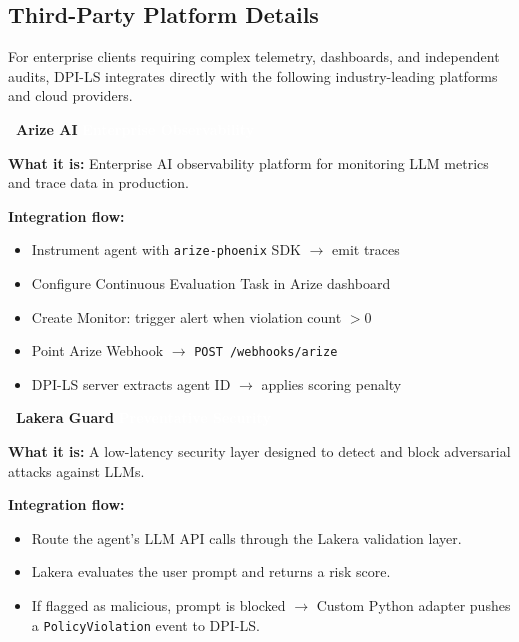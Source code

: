 \documentclass[11pt,a4paper]{article}
\begin{document}
\vspace{0.5cm}
\subsection{Third-Party Platform Details}

For enterprise clients requiring complex telemetry, dashboards, and independent audits, DPI-LS integrates directly with the following industry-leading platforms and cloud providers.

\vspace{0.5cm}
\noindent\textbf{\large \faEye\ Arize AI} \quad \colorbox{dpiteal}{\textcolor{white}{\small \textbf{Enterprise Observability}}}\\[0.2cm]
\begin{tcolorbox}[enhanced, colback=white, colframe=dpiteal, boxrule=0pt, leftrule=3pt, sharp corners, top=2mm, bottom=2mm]
\textbf{What it is:} Enterprise AI observability platform for monitoring LLM metrics and trace data in production.

\textbf{Integration flow:}
\begin{itemize}
    \item[\textcolor{dpiteal}{\textbf{1.}}] Instrument agent with \texttt{arize-phoenix} SDK $\rightarrow$ emit traces
    \item[\textcolor{dpiteal}{\textbf{2.}}] Configure Continuous Evaluation Task in Arize dashboard
    \item[\textcolor{dpiteal}{\textbf{3.}}] Create Monitor: trigger alert when violation count $> 0$
    \item[\textcolor{dpiteal}{\textbf{4.}}] Point Arize Webhook $\rightarrow$ \texttt{POST /webhooks/arize}
    \item[\textcolor{dpiteal}{\textbf{5.}}] DPI-LS server extracts agent ID $\rightarrow$ applies scoring penalty
\end{itemize}
\end{tcolorbox}

\vspace{0.5cm}
\noindent\textbf{\large \faUserShield\ Lakera Guard} \quad \colorbox{dpired}{\textcolor{white}{\small \textbf{Preventative Security}}}\\[0.2cm]
\begin{tcolorbox}[enhanced, colback=white, colframe=dpired, boxrule=0pt, leftrule=3pt, sharp corners, top=2mm, bottom=2mm]
\textbf{What it is:} A low-latency security layer designed to detect and block adversarial attacks against LLMs.

\textbf{Integration flow:}
\begin{itemize}
    \item[\textcolor{dpired}{\textbf{1.}}] Route the agent's LLM API calls through the Lakera validation layer.
    \item[\textcolor{dpired}{\textbf{2.}}] Lakera evaluates the user prompt and returns a risk score.
    \item[\textcolor{dpired}{\textbf{3.}}] If flagged as malicious, prompt is blocked $\rightarrow$ Custom Python adapter pushes a \texttt{PolicyViolation} event to DPI-LS.
\end{itemize}
\end{tcolorbox}
\end{document}
